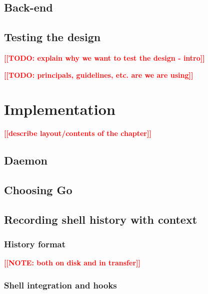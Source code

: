 \documentclass[thesis=M,english]{FITthesis}[2012/10/20]
\newcommand{\blind}[1][1]{}
\newcommand{\todotext}[1]{\textcolor{red}{\textbf{[[#1]]}}}
\begin{document}
\section{Back-end}

\blind

\section{Testing the design}

\todotext{TODO: explain why we want to test the design - intro}

\todotext{TODO: principals, guidelines, etc. are we are using}

\blind[3]

\chapter{Implementation}
\todotext{describe layout/contents of the chapter}

\blind

\section{Daemon}

\blind

\section{Choosing Go}

\blind[3]

\section{Recording shell history with context}

\blind

\subsection{History format}

\todotext{NOTE: both on disk and in transfer}

\blind

\subsection{Shell integration and hooks}
\end{document}
